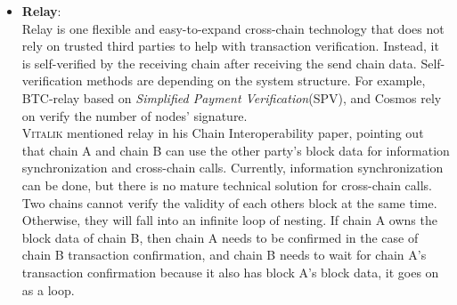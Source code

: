 \begin{itemize}
\begin{itemize}
\begin{figure}[H]
        \centering
        \caption{Distributed signature Notary Scheme diagram}%
        \centering
        \label{fig:dno}
        \end{figure}
        As Figure \ref{fig:dno} shows, distributed signature based on cryptography, the key point is that for cross-chain transactions, the system generates one and only one key, and no one in the notary group will have a complete key. The key is randomly sent to each notary node in the form of fragments.
        Meanwhile, the fragment is processed as ciphertexts, making it impossible to extract the complete key even all the participants put the pieces together. Thus, the security of the key is fully guaranteed.
    \end{itemize}
    \item \textbf{Relay\cite{buterin2016chain}}:\\
    Relay is one flexible and easy-to-expand cross-chain technology that does not rely on trusted third parties to help with transaction verification. Instead, it is self-verified by the receiving chain after receiving the send chain data. Self-verification methods are depending on the system structure. For example, BTC-relay\cite{btc-relay} based on \textit{Simplified Payment Verification}(SPV), and Cosmos\cite{cosmos} rely on verify the number of nodes' signature.\\
    \textsc{Vitalik} mentioned relay in his Chain Interoperability paper\cite{buterin2016chain}, pointing out that chain A and chain B can use the other party's block data for information synchronization and cross-chain calls. Currently, information synchronization can be done, but there is no mature technical solution for cross-chain calls. Two chains cannot verify the validity of each others block at the same time. Otherwise, they will fall into an infinite loop of nesting. If chain A owns the block data of chain B, then chain A needs to be confirmed in the case of chain B transaction confirmation, and chain B needs to wait for chain A's transaction confirmation because it also has block A's block data, it goes on as a loop.
    
    
    

\end{itemize}
